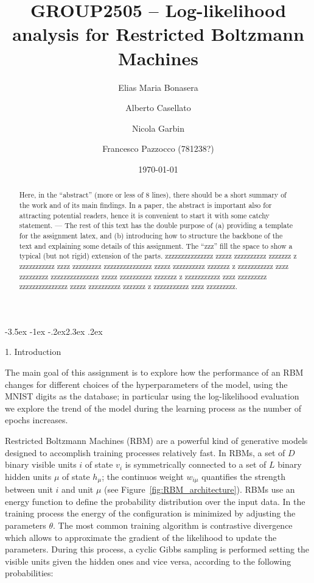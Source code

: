 \documentclass[prl,twocolumn]{revtex4-1}
\makeatletter
\renewcommand{\section}{\@startsection{section}{1}{\z@}%
	{-3.5ex \@plus -1ex \@minus -.2ex}{2.3ex \@plus.2ex}%
	{\normalfont\bfseries\raggedright}}
\makeatother
\begin{document}
\title{GROUP2505 -- Log-likelihood analysis for Restricted Boltzmann Machines}





\author{Elias Maria Bonasera}
\author{Alberto Casellato}
\author{Nicola Garbin}
\author{Francesco Pazzocco (781238?)}

\date{\today}


\begin{abstract}
  Here, in the ``abstract'' (more or less of 8 lines), there should be a short summary of the work and of its main findings. In a paper, the abstract is important also for attracting potential readers, hence it is convenient to start it with some catchy statement. ---
 The rest of this text has the double purpose of (a) providing a template for the assignment latex, and (b) introducing how to structure the backbone of the text and explaining some details of this assignment. The ``zzz'' fill the space to show a typical (but not rigid) extension of the parts.
  zzzzzzzzzzzzzzz zzzzz zzzzzzzzzz zzzzzzz z zzzzzzzzzzz zzzz zzzzzzzzz
  zzzzzzzzzzzzzzz zzzzz zzzzzzzzzz zzzzzzz z zzzzzzzzzzz zzzz zzzzzzzzz
  zzzzzzzzzzzzzzz zzzzz zzzzzzzzzz zzzzzzz z zzzzzzzzzzz zzzz zzzzzzzzz
  zzzzzzzzzzzzzzz zzzzz zzzzzzzzzz zzzzzzz z zzzzzzzzzzz zzzz zzzzzzzzz.
\end{abstract}

\maketitle


\section{1. Introduction}

The main goal of this assignment is to explore how the performance of an RBM changes for different choices of the hyperparameters of the model, using the MNIST digits as the database; in particular using the log-likelihood evaluation we explore the trend of the model during the learning process as the number of epochs increases.

Restricted Boltzmann Machines (RBM) are a powerful kind of generative models designed to accomplish training processes relatively fast. In RBMs, a set of $D$ binary visible units $i$ of state $v_i$ is symmetrically connected to a set of $L$ binary hidden units $\mu$ of state $h_\mu$; the continuos weight $w_{i\mu}$ quantifies the strength between unit $i$ and unit $\mu$ (see Figure~\ref{fig:RBM_architecture}). RBMs use an energy function to define the probability distribution over the input data. In the training process the energy of the configuration is minimized by adjusting the parameters $\theta$. The most common training algorithm is contrastive divergence which allows to approximate the gradient of the likelihood to update the parameters. During this process, a cyclic Gibbs sampling is performed setting the visible units given the hidden ones and vice versa, according to the following probabilities:
\end{document}

